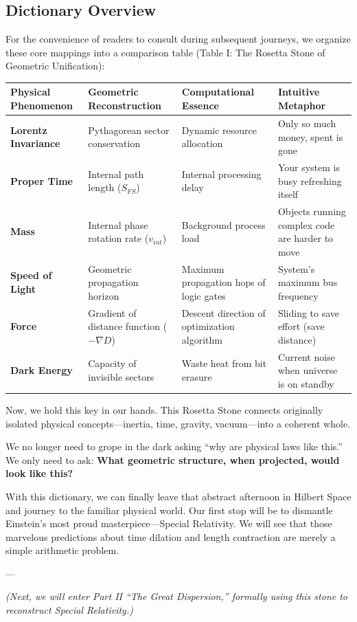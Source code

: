 \subsection{Dictionary Overview}

For the convenience of readers to consult during subsequent journeys, we organize these core mappings into a comparison table (Table I: The Rosetta Stone of Geometric Unification):

\begin{table}[h]
\centering
\begin{tabular}{|l|l|l|l|}
\hline
\textbf{Physical Phenomenon} & \textbf{Geometric Reconstruction} & \textbf{Computational Essence} & \textbf{Intuitive Metaphor} \\
\hline
\textbf{Lorentz Invariance} & Pythagorean sector conservation & Dynamic resource allocation & Only so much money, spent is gone \\
\hline
\textbf{Proper Time} & Internal path length ($S_{FS}$) & Internal processing delay & Your system is busy refreshing itself \\
\hline
\textbf{Mass} & Internal phase rotation rate ($v_{int}$) & Background process load & Objects running complex code are harder to move \\
\hline
\textbf{Speed of Light} & Geometric propagation horizon & Maximum propagation hops of logic gates & System's maximum bus frequency \\
\hline
\textbf{Force} & Gradient of distance function ($-\nabla D$) & Descent direction of optimization algorithm & Sliding to save effort (save distance) \\
\hline
\textbf{Dark Energy} & Capacity of invisible sectors & Waste heat from bit erasure & Current noise when universe is on standby \\
\hline
\end{tabular}
\end{table}

Now, we hold this key in our hands. This Rosetta Stone connects originally isolated physical concepts---inertia, time, gravity, vacuum---into a coherent whole.

We no longer need to grope in the dark asking ``why are physical laws like this.'' We only need to ask: \textbf{What geometric structure, when projected, would look like this?}

With this dictionary, we can finally leave that abstract afternoon in Hilbert Space and journey to the familiar physical world. Our first stop will be to dismantle Einstein's most proud masterpiece---Special Relativity. We will see that those marvelous predictions about time dilation and length contraction are merely a simple arithmetic problem.

---

\textit{(Next, we will enter Part II ``The Great Dispersion,'' formally using this stone to reconstruct Special Relativity.)}

